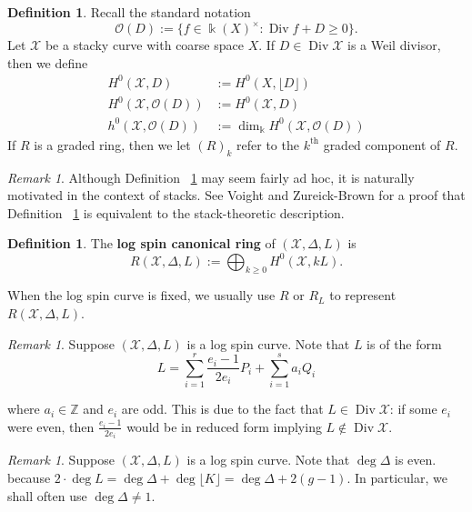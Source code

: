 \documentclass{amsart}
\theoremstyle{plain}
\theoremstyle{definition}
\newtheorem{defn}[thm]{Definition}
\theoremstyle{remark}
\newtheorem{rem}[thm]{Remark}
\numberwithin{equation}{section}
\newcommand\BZ{{\mathbb Z}}
\newcommand\Bk{{\Bbbk}}
\newcommand\sco{{\mathscr O}}
\DeclareMathOperator\di{Div}
\newcommand\sx{\mathscr X}
\newcommand \subhalf[1]{\frac{{#1} - 1}{2{#1}}}
\newcommand{\halfcan}{L}
\begin{document}
\begin{defn}
\label{defn:h0-stacky}
Recall the standard notation 
$$\sco(D) := \{f \in \Bk(X)^\times : \di f + D \geq 0 \}.$$
Let $\sx$ be a stacky curve with coarse space $X$.
If $D \in \di \sx$ is a Weil divisor, then we define
\begin{align*}
	H^0(\sx, D) &:= H^0(X, \lfloor D \rfloor)\\
	H^0(\sx, \sco(D)) &:= H^0(\sx, D)\\
	h^0(\sx, \sco(D)) &:= \dim_\Bk H^0(\sx, \sco(D))
\end{align*}
If $R$ is a graded ring, then we let $(R)_k$ refer to the $k^\text{th}$
graded component of $R$.

\end{defn}

\begin{rem}
Although Definition ~\ref{defn:h0-stacky} may seem fairly ad hoc, it is naturally motivated in the context of stacks. See Voight and Zureick-Brown \cite[Lemma 5.4.7]{vzb:stacky} for a proof that Definition ~\ref{defn:h0-stacky} is equivalent to the stack-theoretic description.
\end{rem}

\begin{defn}
\label{defn:log-spin-canonical-ring}
The {\bf log spin canonical ring} of $(\sx, \Delta, \halfcan)$ is
\[
	R(\sx, \Delta, \halfcan) := \bigoplus_{k \geq 0} H^0(\sx, k \halfcan).
\]
\end{defn}

\noindent
When the log spin curve is fixed, we usually use $R$ or $R_\halfcan$ to
represent $R(\sx, \Delta, \halfcan)$.

\begin{rem}
\label{rem:odd-denom}
Suppose $(\sx, \Delta, L)$ is a log spin curve. Note that $\halfcan$ is of the form
\[
	\halfcan = \sum_{i = 1}^{r} \subhalf{e_i} P_i + \sum_{i = 1}^{s} a_i Q_i
\]

\noindent
where $a_i \in \BZ$ and $e_i$ are odd. This is due to the fact
that $\halfcan \in \di \sx$: 
if some $e_i$ were even,
then $\frac{e_i - 1}{2e_i}$ would be in reduced form implying $\halfcan \notin \di \sx$.
\end{rem}
	
\begin{rem}
\label{rem:delta-not-1}
Suppose $(\sx, \Delta, \halfcan)$ is a log spin curve. Note that $\deg \Delta$
is even. because $2 \cdot \deg \halfcan = \deg \Delta + \deg \lfloor K
\rfloor = \deg \Delta + 2(g-1).$
In particular, we shall often use $\deg \Delta \neq 1$.
\end{rem}
\end{document}

